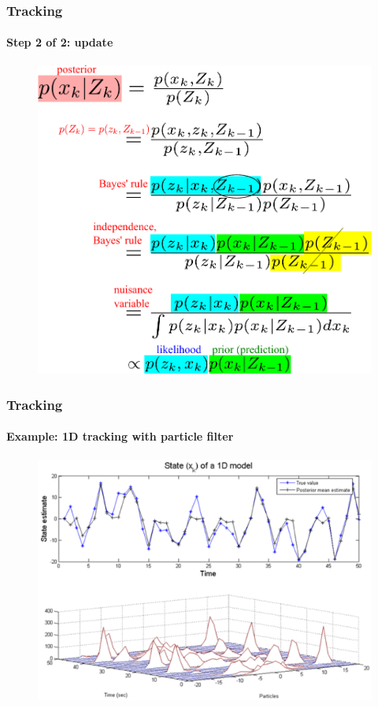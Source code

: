 \begin{frame}
\frametitle{Tracking}
\framesubtitle{Step 2 of 2: update}
\logoCSIPCPL\mypagenum
\begin{figure}
\includegraphics[height=0.8\textheight]{thesis/TRK_EQN_update.pdf}
\end{figure}
\end{frame}

\begin{frame}
\frametitle{Tracking}
\framesubtitle{Example: 1D tracking with particle filter}
\logoCSIPCPL\mypagenum
\begin{figure}
\includegraphics[width=1.0\textwidth]{thesis/TRK_ParticleFilter_multimodalPDF.pdf}
\end{figure}	
\end{frame}



